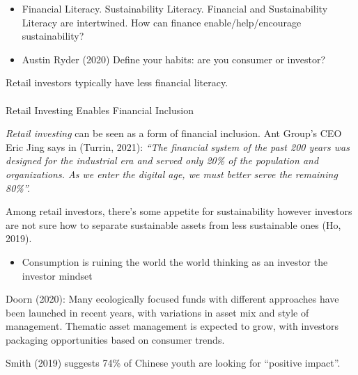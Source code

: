 \documentclass[
  letterpaper,
  DIV=11,
  numbers=noendperiod]{scrartcl}
\makeatletter
\let\oldparagraph\paragraph
\renewcommand{\paragraph}{
    \@ifstar
      \xxxParagraphStar
      \xxxParagraphNoStar
  }
\newcommand{\xxxParagraphStar}[1]{\oldparagraph*{#1}\mbox{}}
\newcommand{\xxxParagraphNoStar}[1]{\oldparagraph{#1}\mbox{}}
\providecommand{\tightlist}{%
  \setlength{\itemsep}{0pt}\setlength{\parskip}{0pt}}\usepackage{longtable,booktabs,array}
\makeatother
\begin{document}
\begin{itemize}
\tightlist
\item
  Financial Literacy. Sustainability Literacy. Financial and
  Sustainability Literacy are intertwined. How can finance
  enable/help/encourage sustainability?
\item
  Austin Ryder (2020) Define your habits: are you consumer or investor?
\end{itemize}

Retail investors typically have less financial literacy.

\paragraph{Retail Investing Enables Financial
Inclusion}\label{retail-investing-enables-financial-inclusion}

\emph{Retail investing} can be seen as a form of financial inclusion.
Ant Group's CEO Eric Jing says in (Turrin, 2021): \emph{``The financial
system of the past 200 years was designed for the industrial era and
served only 20\% of the population and organizations. As we enter the
digital age, we must better serve the remaining 80\%''.}

Among retail investors, there's some appetite for sustainability however
investors are not sure how to separate sustainable assets from less
sustainable ones (Ho, 2019).

\begin{itemize}
\tightlist
\item
  Consumption is ruining the world the world thinking as an investor the
  investor mindset
\end{itemize}

Doorn (2020): Many ecologically focused funds with different approaches
have been launched in recent years, with variations in asset mix and
style of management. Thematic asset management is expected to grow, with
investors packaging opportunities based on consumer trends.

Smith (2019) suggests 74\% of Chinese youth are looking for ``positive
impact''.
\end{document}
